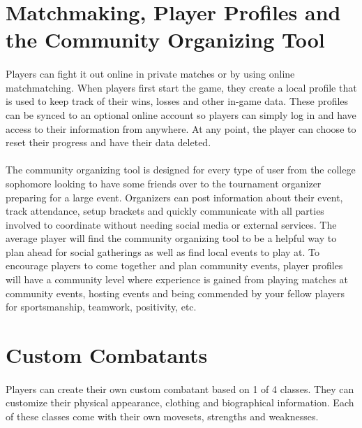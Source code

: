 \section{Matchmaking, Player Profiles and the Community Organizing Tool}

\paragraph{} Players can fight it out online in private matches or by using online matchmatching. When players first start the game, they create a local profile that is used to keep track of their wins, losses and other in-game data. These profiles can be synced to an optional online account so players can simply log in and have access to their information from anywhere. At any point, the player can choose to reset their progress and have their data deleted.

\paragraph{} The community organizing tool is designed for every type of user from the college sophomore looking to have some friends over to the tournament organizer preparing for a large event. Organizers can post information about their event, track attendance, setup brackets and quickly communicate with all parties involved to coordinate without needing social media or external services. The average player will find the community organizing tool to be a helpful way to plan ahead for social gatherings as well as find local events to play at. To encourage players to come together and plan community events, player profiles will have a community level where experience is gained from playing matches at community events, hosting events and being commended by your fellow players for sportsmanship, teamwork, positivity, etc.

\section{Custom Combatants}

\paragraph{} Players can create their own custom combatant based on 1 of 4 classes. They can customize their physical appearance, clothing and biographical information. Each of these classes come with their own movesets, strengths and weaknesses.

